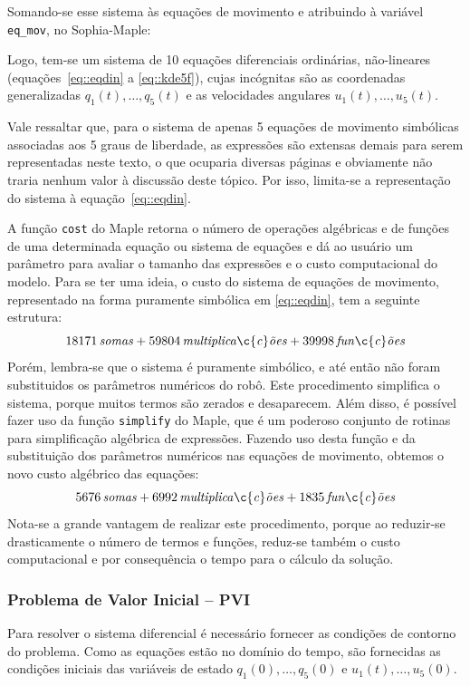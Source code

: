 Somando-se esse sistema às equações de movimento e atribuindo à variável
\texttt{eq\_mov}, no Sophia-Maple:

\bigskip {} \bigskip

Logo, tem-se um sistema de 10 equações diferenciais ordinárias, não-lineares
(equações~\ref{eq::eqdin} a \ref{eq::kde5f}), cujas incógnitas são as
coordenadas generalizadas $q_{1}(t),\ldots, q_{5}(t)$ e as velocidades angulares
$u_{1}(t),\ldots, u_{5}(t)$.

Vale ressaltar que, para o sistema de apenas 5 equações de movimento simbólicas
associadas aos 5 graus de liberdade, as expressões são extensas demais para
serem representadas neste texto, o que ocuparia diversas páginas e obviamente
não traria nenhum valor à discussão deste tópico. Por isso, limita-se a
representação do sistema à equação~\ref{eq::eqdin}.

A função \texttt{cost} do Maple retorna o número de operações algébricas e de
funções de uma determinada equação ou sistema de equações e dá ao usuário um
parâmetro para avaliar o tamanho das expressões e o custo computacional do
modelo.
Para se ter uma ideia, o custo do sistema de equações de movimento, representado
na forma puramente simbólica em \ref{eq::eqdin}, tem  a seguinte estrutura:
%
	$$ 18171\,{\it somas}+59804\,{\it multiplica\c{c}\tilde{o}es}+39998\,{\it 
fun\c{c}\tilde{o}es} $$
%
Porém, lembra-se que o sistema é puramente simbólico, e até então não foram
substituidos os parâmetros numéricos do robô.
Este procedimento simplifica o sistema, porque muitos termos são zerados e
desaparecem.
Além disso, é possível fazer uso da função \texttt{simplify} do Maple, que é um
poderoso conjunto de rotinas para simplificação algébrica de expressões. Fazendo
uso desta função e da substituição dos parâmetros numéricos nas equações de
movimento, obtemos o novo custo algébrico das equações:
%
	$$ 5676\,{\it somas}+6992\,{\it multiplica\c{c}\tilde{o}es}+1835\,{\it fun\c{c}\tilde{o}es} $$
%
Nota-se a grande vantagem de realizar este procedimento, porque ao reduzir-se
drasticamente o número de termos e funções, reduz-se também o custo
computacional e por consequência o tempo para o cálculo da solução.

\subsubsection{Problema de Valor Inicial -- PVI}

Para resolver o sistema diferencial é necessário fornecer as condições de
contorno do problema. Como as equações estão no domínio do tempo, são fornecidas
as condições iniciais das variáveis de estado $q_{1}(0),\ldots, q_{5}(0)$ e
$u_{1}(t),\ldots, u_{5}(0)$.


